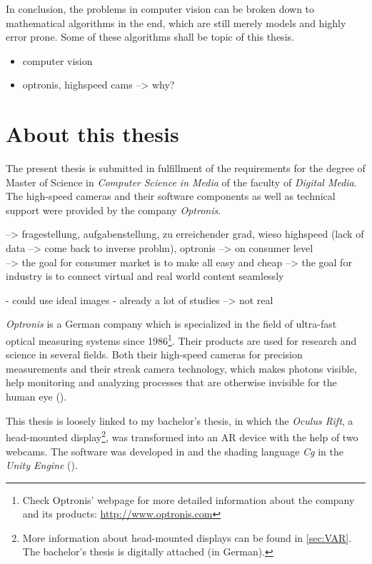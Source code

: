 In conclusion, the problems in computer vision can be broken down to mathematical algorithms in the end, which are still merely models and highly error prone. Some of these algorithms shall be topic of this thesis.  
 
\begin{itemize}
\item computer vision 

\item optronis, highspeed cams --> why?
\end{itemize}
 
\section{About this thesis}
The present thesis is submitted in fulfillment of the requirements for the degree of Master of Science in \textit{Computer Science in Media} of the faculty of \textit{Digital Media}. The high-speed cameras and their software components as well as technical support were provided by the company \textit{Optronis}.

--> fragestellung, aufgabenstellung, zu erreichender grad, wieso highspeed (lack of data --> come back to inverse problm), optronis --> on consumer level \\
--> the goal for consumer market is to make all easy and cheap 
--> the goal for industry is to connect virtual and real world content seamlessly  

- could use ideal images - already a lot of studies --> not real

\textit{Optronis} is a German company which is specialized in the field of ultra-fast optical measuring systems since 1986\footnote{Check Optronis' webpage for more detailed information about the company and its products: \url{http://www.optronis.com}}. Their products are used for research and science in several fields. Both their high-speed cameras for precision measurements and their streak camera technology, which makes photons visible, help monitoring and analyzing processes that are otherwise invisible for the human eye (\cite{Optronis.2016}).

This thesis is loosely linked to my bachelor's thesis, in which the \textit{Oculus Rift}, a head-mounted display\footnote{More information about head-mounted displays can be found in \autoref{sec:VAR}. The  bachelor's thesis is digitally attached (in German).}, was transformed into an AR device with the help of two webcams. The software was developed in \CS and the shading language \textit{Cg} in the \textit{Unity Engine} (\cite{Haefele.2014}).     

